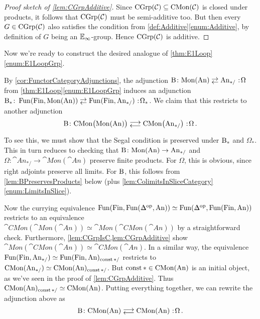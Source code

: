 \begin{proof}[Proof sketch of \cref{lem:CGrpAdditive}]
	Since $\mathrm{CGrp}(\mathcal{C})\subseteq \mathrm{CMon}(\mathcal{C})$ is closed under products, it follows that $\mathrm{CGrp}(\mathcal{C})$ must be semi-additive too. But then every $G\in\mathrm{CGrp}(\mathcal{C})$ also satisfies the condition from \cref{def:Additive}\cref{enum:Additive}, by definition of $G$ being an $\mathbb{E}_\infty$-group. Hence $\mathrm{CGrp}(\mathcal{C})$ is additive.
\end{proof} 
Now we're ready to construct the desired analogue of \cref{thm:E1Loop}\cref{enum:E1LoopGrp}.
\begin{con}\label{con:BOmegaAdjunction}
	By \cref{cor:FunctorCategoryAdjunctions}, the adjunction $\B\colon \cat{Mon}(\cat{An})\shortdoublelrmorphism \cat{An}_{*/}\noloc \Omega$ from \cref{thm:E1Loop}\cref{enum:E1LoopGrp} induces an adjunction $\B_*\colon \Fun(\cat{Fin},\cat{Mon}(\cat{An}))\shortdoublelrmorphism \Fun(\cat{Fin},\cat{An}_{*/})\noloc \Omega_*$. We claim that this restricts to another adjunction
	\begin{equation*}
		\B\colon \cat{CMon}\lef(\cat{Mon}(\cat{An})\righ)\doublelrmorphism \cat{CMon}\bigl(\cat{An}_{*/}\bigr)\noloc \Omega\,.
	\end{equation*}
	To see this, we must show that the Segal condition is preserved under $\mathrm{B}_*$ and $\Omega_*$. This in turn reduces to checking that $\mathrm{B}\colon \mathrm{Mon}(\mathrm{An})\rightarrow \mathrm{An}_{*/}$ and $\Omega\colon \cat{An}_{*/}\rightarrow\cat{Mon}(\cat{An})$ preserve finite products. For $\Omega$, this is obvious, since right adjoints preserve all limits. For $\mathrm{B}$, this follows from \cref{lem:BPreservesProducts} below (plus \cref{lem:ColimitsInSliceCategory}\cref{enum:LimitsInSlice}).
	
	Now the currying equivalence $\Fun(\cat{Fin},\Fun(\IDelta^\op,\cat{An}))\simeq \Fun(\IDelta^\op,\Fun(\cat{Fin},\cat{An}))$ restricts to an equivalence $\cat{CMon}(\cat{Mon}(\cat{An}))\simeq \cat{Mon}(\cat{CMon}(\cat{An}))$ by a straightforward check. Furthermore, \cref{lem:CGrpIsC,lem:CGrpAdditive} show $\cat{Mon}(\cat{CMon}(\cat{An}))\simeq \cat{CMon}(\cat{An})$. In a similar way, the equivalence $\operatorname{Fun}(\mathrm{Fin},\mathrm{An}_{*/})\simeq \operatorname{Fun}(\mathrm{Fin},\mathrm{An})_{\operatorname{const} */}$ restricts to $\mathrm{CMon}(\mathrm{An}_{*/})\simeq \mathrm{CMon}(\mathrm{An})_{\operatorname{const} */}$. But $\operatorname{const} *\in \mathrm{CMon}(\mathrm{An})$ is an initial object, as we've seen in the proof of \cref{lem:CGrpAdditive}. Thus $\mathrm{CMon}(\mathrm{An})_{\operatorname{const} */}\simeq \mathrm{CMon}(\mathrm{An})$. Putting everything together, we can rewrite the adjunction above as
	\begin{equation*}
		\B\colon \cat{CMon}(\cat{An})\doublelrmorphism \cat{CMon}(\cat{An})\noloc \Omega\,.
	\end{equation*}
\end{con}
